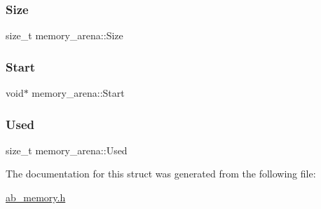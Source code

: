 \subsubsection{\texorpdfstring{Size}{Size}}
{\footnotesize\ttfamily size\+\_\+t memory\+\_\+arena\+::\+Size}

\mbox{\label{structmemory__arena_a165e8a081bbf8241543164a8a0c580ea}} 
\subsubsection{\texorpdfstring{Start}{Start}}
{\footnotesize\ttfamily void$\ast$ memory\+\_\+arena\+::\+Start}

\mbox{\label{structmemory__arena_abbc4860a3014af6eae9d663a4e1e12d9}} 
\subsubsection{\texorpdfstring{Used}{Used}}
{\footnotesize\ttfamily size\+\_\+t memory\+\_\+arena\+::\+Used}



The documentation for this struct was generated from the following file\+:\begin{DoxyCompactItemize}
\item 
\hyperlink{ab__memory_8h}{ab\+\_\+memory.\+h}\end{DoxyCompactItemize}
